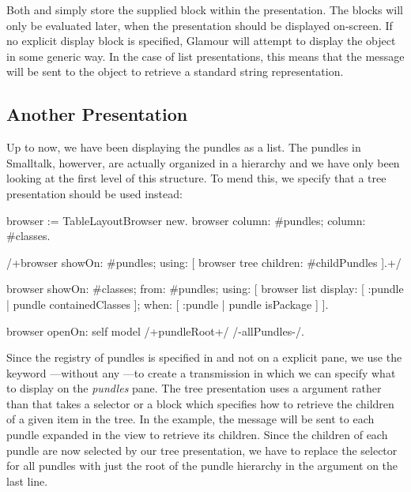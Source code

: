 \documentclass[a4paper,10pt,twoside]{book}
\begin{document}
Both  and  simply store the supplied block within the presentation. The blocks will only be evaluated later, when the presentation should be displayed on-screen. If no explicit display block is specified, Glamour will attempt to display the object in some generic way. In the case of list presentations, this means that the  message will be sent to the object to retrieve a standard string representation.



\subsection{Another Presentation}

Up to now, we have been displaying the pundles as a list. The pundles in Smalltalk, howerver, are actually organized in a hierarchy and we have only been looking at the first level of this structure. To mend this, we specify that a tree presentation should be used instead:

\begin{code}{}
browser := TableLayoutBrowser new.
browser
	column: #pundles;
	column: #classes.	

/+browser showOn: #pundles; using: [
	browser tree
		children: #childPundles
].+/

browser showOn: #classes; from: #pundles; using: [
	browser list
		display: [ :pundle | pundle containedClasses ];
		when: [ :pundle | pundle isPackage ]
].

browser openOn: self model /+pundleRoot+/ /-allPundles-/.
\end{code}

Since the registry of pundles is specified in  and not on a explicit pane, we use the keyword ---without any ---to create a transmission in which we can specify what to display on the \emph{pundles} pane. The tree presentation uses a  argument rather than  that takes a selector or a block which specifies how to retrieve the children of a given item in the tree. In the example, the message  will be sent to each pundle expanded in the view to retrieve its children. Since the children of each pundle are now selected by our tree presentation, we have to replace the selector for all pundles with just the root of the pundle hierarchy in the  argument on the last line.
\end{document}
